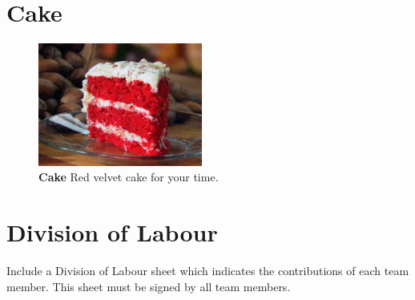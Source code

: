 \documentclass[]{article}
\begin{document}
\section{Cake}
\begin{figure} [H]
    \centering
    \includegraphics[width=0.48\textwidth]{cake.jpg}
	\caption{\textbf{Cake} Red velvet cake for your time.}
\end{figure}

\appendix
\section{Division of Labour}
\label{DoL}
Include a Division of Labour sheet which indicates the contributions of each team member. This sheet must be signed by all team members.
\end{document}
